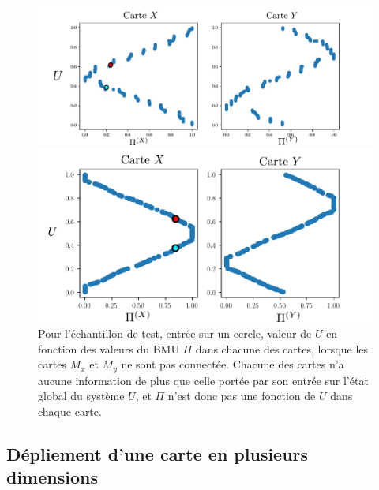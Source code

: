 \begin{figure}
\begin{minipage}{0.45\textwidth}
\includegraphics[width = \textwidth]{XU_YU.pdf}
\caption{Valeur de $U$ en fonction des valeurs du BMU $\Pi$ dans chacune des cartes. On voit que $U$ est une fonction du BMU dans chaque carte, contrairement au cas ou les cartes apprendraient indépendamment sur les mêmes entrées, voir figure \ref{fig:piu_indep}.}
\label{fig:piu}
\end{minipage}
\hfill
\begin{minipage}{0.45\textwidth}
\centering
\includegraphics[width = \textwidth]{xu_yu_unco.pdf}
\caption{Pour l'échantillon de test, entrée sur un cercle, valeur de $U$ en fonction des valeurs du BMU $\Pi$ dans chacune des cartes, lorsque les cartes $M_x$ et $M_y$ ne sont pas connectée. Chacune des cartes n'a aucune information de plus que celle portée par son entrée sur l'état global du système $U$, et $\Pi$ n'est donc pas une fonction de $U$ dans chaque carte. }
\label{fig:piu_indep}
\end{minipage}

\end{figure}


\subsection{Dépliement d'une carte en plusieurs dimensions}

